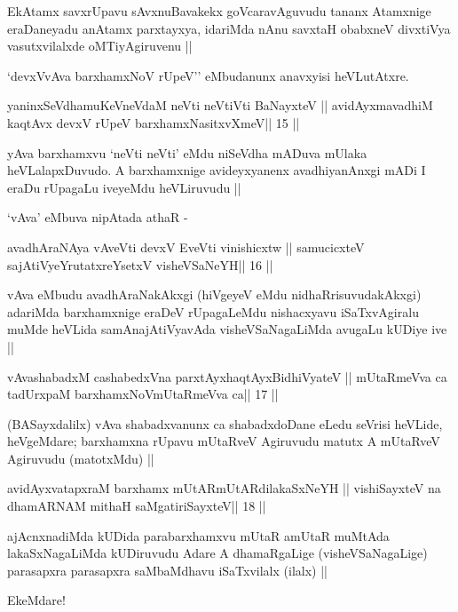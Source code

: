 \begin{artha}
EkAtamx savxrUpavu sAvxnuBavakekx goVcaravAguvudu tananx Atamxnige
eraDaneyadu anAtamx parxtayxya, idariMda nAnu savxtaH obabxneV
divxtiVya vasutxvilalxde oMTiyAgiruvenu || 

`devxVvAva barxhamxNoV rUpeV'' eMbudanunx anavxyisi heVLutAtxre.
\end{artha}

\begin{shl}
yaninxSeVdhamuKeVneVdaM neVti neVtiVti BaNayxteV ||
avidAyxmavadhiM kaqtAvx devxV rUpeV barxhamxNasitxvXmeV\hfill || 15 ||
\end{shl}

\begin{artha}
yAva barxhamxvu `neVti neVti' eMdu niSeVdha mADuva mUlaka
heVLalapxDuvudo. A barxhamxnige avideyxyanenx avadhiyanAnxgi mADi I
eraDu rUpagaLu iveyeMdu heVLiruvudu ||

`vAva' eMbuva nipAtada athaR -
\end{artha}

\begin{shl}
avadhAraNAya vAveVti devxV EveVti vinishicxtw ||
samucicxteV sajAtiVyeYrutatxreYsetxV visheVSaNeYH\hfill || 16 ||
\end{shl}

\begin{artha}
vAva eMbudu avadhAraNakAkxgi (hiVgeyeV eMdu nidhaRrisuvudakAkxgi)
adariMda barxhamxnige eraDeV rUpagaLeMdu nishacxyavu iSaTxvAgiralu
muMde heVLida samAnajAtiVyavAda visheVSaNagaLiMda avugaLu kUDiye ive ||
\end{artha}

\begin{shl}
vAvashabadxM cashabedxVna parxtAyxhaqtAyxBidhiVyateV ||
mUtaRmeVva ca tadUrxpaM barxhamxNoV\s mUtaRmeVva ca\hfill || 17 ||
\end{shl}

\begin{artha}
(BASayxdalilx) vAva shabadxvanunx ca shabadxdoDane eLedu seVrisi
  heVLide, heVgeMdare; barxhamxna rUpavu mUtaRveV Agiruvudu matutx A
  mUtaRveV Agiruvudu (matotxMdu) ||
\end{artha}

\begin{shl}
avidAyxvatapxraM barxhamx mUtARmUtARdilakaSxNeYH ||
vishiSayxteV na dhamARNAM mithaH saMgatiriSayxteV\hfill || 18 ||
\end{shl}

\begin{artha}
ajAcnxnadiMda kUDida parabarxhamxvu mUtaR amUtaR muMtAda
lakaSxNagaLiMda kUDiruvudu Adare A dhamaRgaLige (visheVSaNagaLige)
parasapxra parasapxra saMbaMdhavu iSaTxvilalx (ilalx) || 

EkeMdare!
\end{artha}

